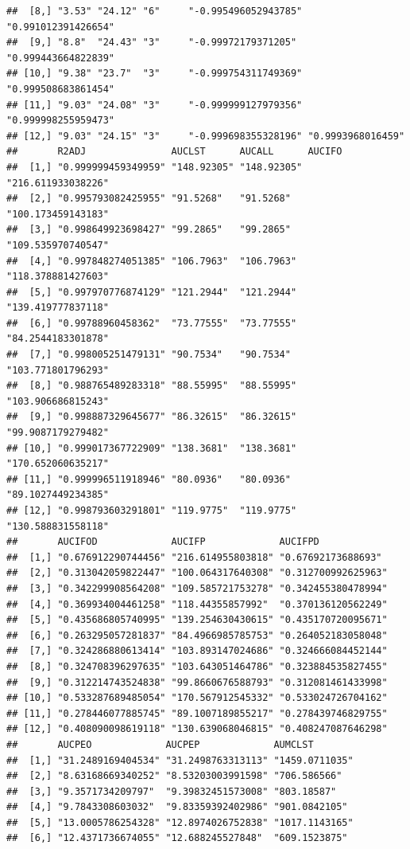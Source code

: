 \documentclass[12pt,]{krantz}
\theoremstyle{definition}
\theoremstyle{definition}
\theoremstyle{definition}
\theoremstyle{remark}
\begin{document}
\begin{verbatim}
##  [8,] "3.53" "24.12" "6"     "-0.995496052943785" "0.991012391426654"
##  [9,] "8.8"  "24.43" "3"     "-0.99972179371205"  "0.999443664822839"
## [10,] "9.38" "23.7"  "3"     "-0.999754311749369" "0.999508683861454"
## [11,] "9.03" "24.08" "3"     "-0.999999127979356" "0.999998255959473"
## [12,] "9.03" "24.15" "3"     "-0.999698355328196" "0.9993968016459"  
##       R2ADJ               AUCLST      AUCALL      AUCIFO            
##  [1,] "0.999999459349959" "148.92305" "148.92305" "216.611933038226"
##  [2,] "0.995793082425955" "91.5268"   "91.5268"   "100.173459143183"
##  [3,] "0.998649923698427" "99.2865"   "99.2865"   "109.535970740547"
##  [4,] "0.997848274051385" "106.7963"  "106.7963"  "118.378881427603"
##  [5,] "0.997970776874129" "121.2944"  "121.2944"  "139.419777837118"
##  [6,] "0.99788960458362"  "73.77555"  "73.77555"  "84.2544183301878"
##  [7,] "0.998005251479131" "90.7534"   "90.7534"   "103.771801796293"
##  [8,] "0.988765489283318" "88.55995"  "88.55995"  "103.906686815243"
##  [9,] "0.998887329645677" "86.32615"  "86.32615"  "99.9087179279482"
## [10,] "0.999017367722909" "138.3681"  "138.3681"  "170.652060635217"
## [11,] "0.999996511918946" "80.0936"   "80.0936"   "89.1027449234385"
## [12,] "0.998793603291801" "119.9775"  "119.9775"  "130.588831558118"
##       AUCIFOD             AUCIFP             AUCIFPD            
##  [1,] "0.676912290744456" "216.614955803818" "0.67692173688693" 
##  [2,] "0.313042059822447" "100.064317640308" "0.312700992625963"
##  [3,] "0.342299908564208" "109.585721753278" "0.342455380478994"
##  [4,] "0.369934004461258" "118.44355857992"  "0.370136120562249"
##  [5,] "0.435686805740995" "139.254630430615" "0.435170720095671"
##  [6,] "0.263295057281837" "84.4966985785753" "0.264052183058048"
##  [7,] "0.324286880613414" "103.893147024686" "0.324666084452144"
##  [8,] "0.324708396297635" "103.643051464786" "0.323884535827455"
##  [9,] "0.312214743524838" "99.8660676588793" "0.312081461433998"
## [10,] "0.533287689485054" "170.567912545332" "0.533024726704162"
## [11,] "0.278446077885745" "89.1007189855217" "0.278439746829755"
## [12,] "0.408090098619118" "130.639068046815" "0.408247087646298"
##       AUCPEO             AUCPEP             AUMCLST       
##  [1,] "31.2489169404534" "31.2498763313113" "1459.0711035"
##  [2,] "8.63168669340252" "8.53203003991598" "706.586566"  
##  [3,] "9.3571734209797"  "9.39832451573008" "803.18587"   
##  [4,] "9.7843308603032"  "9.83359392402986" "901.0842105" 
##  [5,] "13.0005786254328" "12.8974026752838" "1017.1143165"
##  [6,] "12.4371736674055" "12.688245527848"  "609.1523875" 

\end{verbatim}
\end{document}

